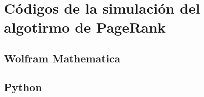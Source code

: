 \chapter{Códigos de la simulación del algotirmo de PageRank}

\section{Wolfram Mathematica}

\section{Python}

